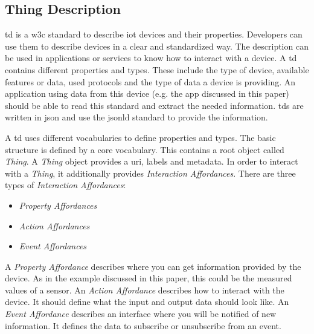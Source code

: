 \subsection{Thing Description}\label{sec:thingdescription}

\gls{td} is a \gls{w3c} standard to describe \gls{iot} devices and their properties. Developers can use them to describe devices in a clear and standardized way. The description can be used in applications or services to know how to interact with a device.
A \gls{td} contains different properties and types. These include the type of device, available features or data, used protocols and the type of data a device is providing.
An application using data from this device (e.g. the app discussed in this paper) should be able to read this standard and extract the needed information. \glspl{td} are written in \gls{json} and use the \gls{jsonld} standard to provide the information.

A \gls{td} uses different vocabularies to define properties and types. The basic structure is defined by a core vocabulary. This contains a root object called \emph{Thing}. A \emph{Thing} object provides a \gls{uri},
labels and metadata. In order to interact with a \emph{Thing}, it additionally provides \emph{Interaction Affordances}. There are three types of \emph{Interaction Affordances}:
\begin{itemize}
  \item \emph{Property Affordances}
  \item \emph{Action Affordances}
  \item \emph{Event Affordances}
\end{itemize}

A \emph{Property Affordance} describes where you can get information provided by the device. As in the example discussed in this paper, this could be the measured values of a sensor.
An \emph{Action Affordance} describes how to interact with the device. It should define what the input and output data should look like.
An \emph{Event Affordance} describes an interface where you will be notified of new information. It defines the data to subscribe or unsubscribe from an event.

